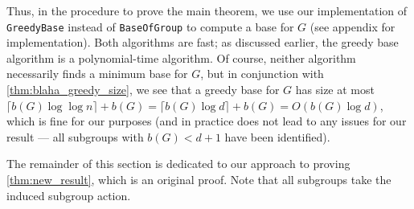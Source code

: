 Thus, in the procedure to prove the main theorem, we use our implementation of \texttt{GreedyBase} instead of \texttt{BaseOfGroup} to compute a base for $G$ (see appendix for implementation). Both algorithms are fast; as discussed earlier, the greedy base algorithm is a polynomial-time algorithm. Of course, neither algorithm necessarily finds a minimum base for $G$, but in conjunction with \autoref{thm:blaha_greedy_size}, we see that a greedy base for $G$ has size at most $\lceil b(G)\log\log n \rceil + b(G) = \lceil b(G)\log d \rceil + b(G) = O(b(G)\log d)$, which is fine for our purposes (and in practice does not lead to any issues for our result --- all subgroups with $b(G) < d + 1$ have been identified).

The remainder of this section is dedicated to our approach to proving \autoref{thm:new_result}, which is an original proof. Note that all subgroups take the induced subgroup action.


